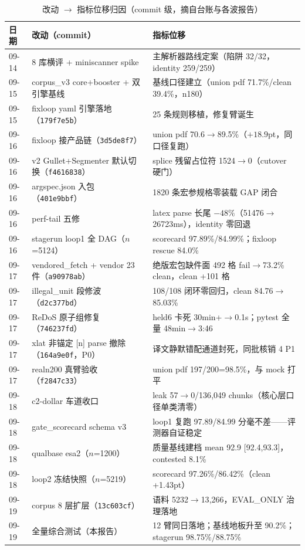 \begin{table}[htbp]
\centering\small
\caption{改动 $\to$ 指标位移归因（commit 级，摘自台账与各波报告）}
\label{tab:attrib}
\begin{tabular}{@{}llp{7.6cm}@{}}
\toprule
日期 & 改动（commit） & 指标位移 \\
\midrule
09-14 & 8 库横评 + miniscanner spike & 主解析器路线定案（陷阱 32/32，identity 259/259） \\
09-15 & corpus\_v3 core+booster + 双引擎基线 & 基线口径建立（union pdf 71.7\%/clean 39.4\%，n180） \\
09-15 & fixloop yaml 引擎落地（\texttt{179f7e5b}） & 25 条规则移植，修复臂诞生 \\
09-16 & fixloop 接产品链（\texttt{3d5de8f7}） & union pdf 70.6$\to$89.5\%（$+18.9$pt，同口径复跑） \\
09-16 & v2 Gullet+Segmenter 默认切换（\texttt{f4616838}） & splice 残留占位符 1524$\to$0（cutover 硬门） \\
09-16 & argspec.json 入包（\texttt{401e9bbf}） & 1820 条宏参规格零装载 GAP 闭合 \\
09-16 & perf-tail 五修 & latex parse 长尾 $-48\%$（51476$\to$26723ms），identity 零回退 \\
09-16 & stagerun loop1 全 DAG（$n$=5124） & scorecard 97.89\%/84.99\%；fixloop rescue 84.0\% \\
09-17 & vendored\_fetch + vendor 23 件（\texttt{a90978ab}） & 绝版宏包缺件面 492 格 fail$\to$73.2\% clean，clean +101 格 \\
09-17 & illegal\_unit 段修波（\texttt{d2c377bd}） & 108/108 闭环零回归，clean 84.76$\to$85.03\% \\
09-17 & ReDoS 原子组修复（\texttt{746237fd}） & held6 卡死 30min+$\to$0.1s；pytest 全量 48min$\to$3:46 \\
09-17 & xlat 非锚定 [n] parse 撤除（\texttt{164a9e0f}，P0） & 译文静默错配通道封死，同批核销 4 P1 \\
09-17 & realn200 真臂验收（\texttt{f2847c33}） & union pdf 197/200=98.5\%，与 mock 打平 \\
09-18 & c2-dollar 车道收口 & leak 57$\to$0/136{,}049 chunks（核心层口径单类清零） \\
09-18 & gate\_scorecard schema v3 & loop1 复跑 97.89/84.99 分毫不差——评测器自证稳定 \\
09-18 & qualbase esa2（$n$=1200） & 质量基线建档 mean 92.9 [92.4,93.3]，contested 8.1\% \\
09-18 & loop2 冻结快照（$n$=5219） & scorecard 97.26\%/86.42\%（clean +1.43pt） \\
09-19 & corpus 8 层扩层（\texttt{13c603cf}） & 语料 5232$\to$13{,}266，EVAL\_ONLY 治理落地 \\
09-19 & 全量综合测试（本报告） & 12 臂同日落地；基线地板升至 90.2\%；stagerun 98.75\%/88.75\% \\
\bottomrule
\end{tabular}
\end{table}

